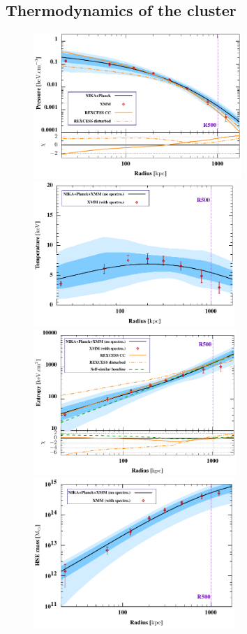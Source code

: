 \documentclass[traditabstract]{aa}
\begin{document}
\subsection{Thermodynamics of the cluster}\label{sec:comparison_X_tSZ}
\begin{figure}[h]
\centering
\includegraphics[height=5.5cm]{NIKA_pressure_prof_multi.pdf}
\hspace{1.3cm}
\includegraphics[height=5.5cm]{NIKA_temperature_prof.pdf}
\includegraphics[height=5.5cm]{NIKA_entropy_prof_multi.pdf}
\hspace{1.3cm}
\includegraphics[height=5.7cm]{NIKA_mass_prof.pdf}

\end{figure}
\end{document}
